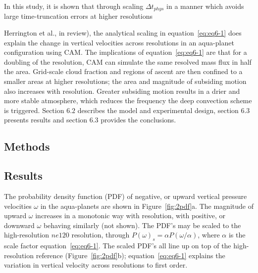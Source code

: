 In this study, it is shown that through scaling $\Delta t_{phys}$ in a manner which avoids large time-truncation errors at higher resolutions {Herrington et al., in review), the analytical scaling in equation~\ref{eq:eq6-1} does explain the change in vertical velocities across resolutions in an aqua-planet configuration using CAM. The implications of equation~\ref{eq:eq6-1} are that for a doubling of the resolution, CAM can simulate the same resolved mass flux in half the area. Grid-scale cloud fraction and regions of ascent are then confined to a smaller areas at higher resolutions; the area and magnitude of subsiding motion also increases with resolution. Greater subsiding motion results in a drier and more stable atmosphere, which reduces the frequency the deep convection scheme is triggered. Section $6.2$ describes the model and experimental design, section 6.3 presents results and section 6.3 provides the conclusions.

\subsection{Methods}

\subsection{Results}

The probability density function (PDF) of negative, or upward vertical pressure velocities $\omega$ in the aqua-planets are shown in Figure~\ref{fig:2pdf}a. The magnitude of upward $\omega$ increases in a monotonic way with resolution, with positive, or downward $\omega$ behaving similarly (not shown). The PDF's may be scaled to the high-resolution $ne120$ resolution, through $P(\omega)_s = \alpha P (\omega / \alpha)$, where $\alpha$ is the scale factor equation~\ref{eq:eq6-1}. The scaled PDF's all line up on top of the high-resolution reference (Figure~\ref{fig:2pdf}b); equation~\ref{eq:eq6-1} explains the variation in vertical velocity across resolutions to first order. 

}
